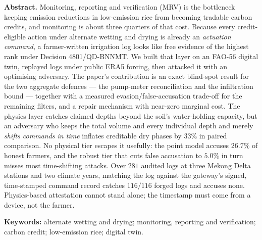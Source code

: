   \vspace{6pt}
  \begin{hujosabstract}
  \noindent\textbf{Abstract.} Monitoring, reporting and verification (MRV) is the bottleneck keeping emission
 reductions in low-emission rice from becoming tradable carbon credits, and
 monitoring is about three quarters of that cost. Because every credit-eligible
 action under alternate wetting and drying is already an \emph{actuation command},
 a farmer-written irrigation log looks like free evidence of the highest rank under
 Decision 4801/QD-BNNMT. We built that layer on an FAO-56 digital twin, replayed logs under public ERA5 forcing, then attacked it with an optimising adversary. The paper's contribution is an exact blind-spot result for the two aggregate
 defences --- the pump-meter reconciliation and the infiltration bound --- together
 with a measured evasion/false-accusation trade-off for the remaining filters, and a
 repair mechanism with near-zero marginal cost. The physics layer catches claimed depths beyond the soil's water-holding capacity, but an adversary who keeps the
 total volume and every individual depth and merely \emph{shifts commands in time}
 inflates creditable dry phases by $33\%$ in paired comparison. No physical tier
 escapes it usefully: the point model accuses $26.7\%$ of honest farmers, and the
 robust tier that cuts false accusation to $5.0\%$ in turn misses most
 time-shifting attacks. Over $281$ audited logs at three Mekong Delta stations
 and two climate years, matching the log against the gateway's signed,
 time-stamped command record catches $116/116$ forged logs and accuses none.
 Physics-based attestation cannot stand alone; the timestamp must come from
 a device, not the farmer.

 \vspace{4pt}

 \noindent\textbf{Keywords:} alternate wetting and drying; monitoring, reporting
  and verification; carbon credit; low-emission rice; digital twin.

  \vspace{10pt}
  \end{hujosabstract}
\endgroup












